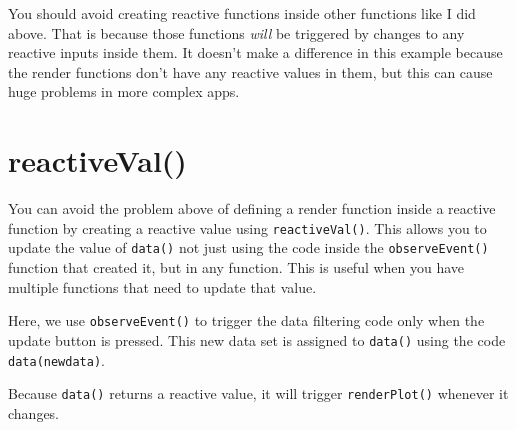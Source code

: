 \documentclass[
  oneside]{book}
\begin{document}
\begin{warning}
You should avoid creating reactive functions inside other functions like I did above. That is because those functions \emph{will} be triggered by changes to any reactive inputs inside them. It doesn't make a difference in this example because the render functions don't have any reactive values in them, but this can cause huge problems in more complex apps.

\end{warning}

\hypertarget{reactiveval}{%
\section{reactiveVal()}\label{reactiveval}}

You can avoid the problem above of defining a render function inside a reactive function by creating a reactive value using \texttt{reactiveVal}\texttt{()}. This allows you to update the value of \texttt{data}\texttt{()} not just using the code inside the \texttt{observeEvent}\texttt{()} function that created it, but in any function. This is useful when you have multiple functions that need to update that value.

Here, we use \texttt{observeEvent}\texttt{()} to trigger the data filtering code only when the update button is pressed. This new data set is assigned to \texttt{data}\texttt{()} using the code \texttt{data(newdata)}.

Because \texttt{data}\texttt{()} returns a reactive value, it will trigger \texttt{renderPlot}\texttt{()} whenever it changes.
\end{document}

